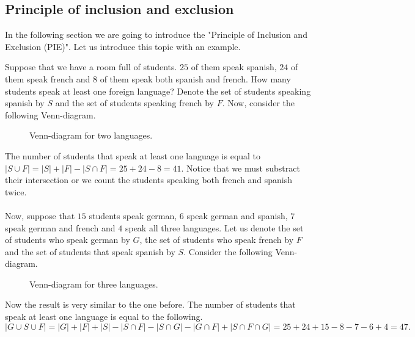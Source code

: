 \subsection{Principle of inclusion and exclusion}

In the following section we are going to introduce the "Principle of Inclusion and Exclusion (PIE)". Let us introduce this topic
with an example.

\begin{exmp}
Suppose that we have a room full of students. $25$ of them speak spanish, $24$ of them speak french and $8$ of them speak both spanish 
and french. How many students speak at least one foreign language? Denote the set of students speaking spanish by $S$ and the 
set of students speaking french by $F$. Now, consider the following Venn-diagram.
\begin{figure}[H]
    \centering
    \caption{Venn-diagram for two languages.}
\end{figure}

The number of students that speak at least one language is equal to $|S \cup F|=|S| + |F|-|S \cap F|=25+24-8=41$. Notice that we must substract their intersection 
or we count the students speaking both french and spanish twice.\\\\
Now, suppose that $15$ students speak german, $6$ speak german and spanish, $7$ speak german and french and 
$4$ speak all three languages. Let us denote the set of students who speak german by $G$, the set of students who speak french by $F$ 
and the set of students that speak spanish by $S$. Consider the following Venn-diagram.

\begin{figure}[H]
    \centering
    \caption{Venn-diagram for three languages.}
\end{figure}
Now the result is very similar to the one before. The number of students that speak at least one language is equal to the following.
$$
|G \cup S \cup F|=|G| + |F| + |S| - |S \cap F| - |S \cap G| - |G \cap F| + |S \cap F \cap G|=25+24+15-8-7-6+4=47.
$$
\end{exmp}

